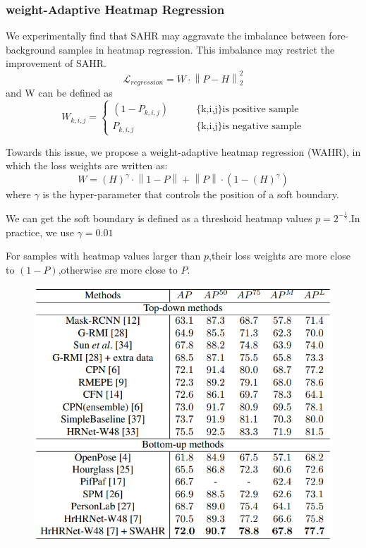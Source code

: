 \documentclass[11pt]{article}
\begin{document}
\subsubsection{weight-Adaptive Heatmap Regression}
We experimentally find that SAHR may aggravate the imbalance between fore-background samples in heatmap regression. This imbalance may restrict the improvement of SAHR.
$$\mathcal{L}_{regression} = W\cdot \left \|P-H \right \|^2_2$$
and W can be defined as $$W_{k,i,j}=\left\{\begin{matrix}
	(1-P_{k,i,j}) &\qquad\text{\{k,i,j\} is positive sample} \\ 
	P_{k,i,j}&\qquad\text{\{k,i,j\} is negative sample}
\end{matrix}\right.$$

Towards this issue, we propose a weight-adaptive heatmap regression (WAHR), in which the loss weights are written as:
$$W = (H)^\gamma \cdot \left \|1-P \right \|+\left \|P \right \|\cdot (1-(H)^\gamma)$$
where $\gamma$ is the hyper-parameter that controls the position of a soft boundary.

We can get the soft boundary is defined as a threshoid heatmap values $p=2^{-\frac{1}{\gamma}}$.In practice, we use $\gamma = 0.01$

For samples with heatmap values larger than $p$,their loss weights are more close to $(1-P)$,otherwise sre more close to $P$.
\begin{figure}[H]
	\centering
	\includegraphics[scale = 0.55]{53}
\end{figure}
\end{document}
